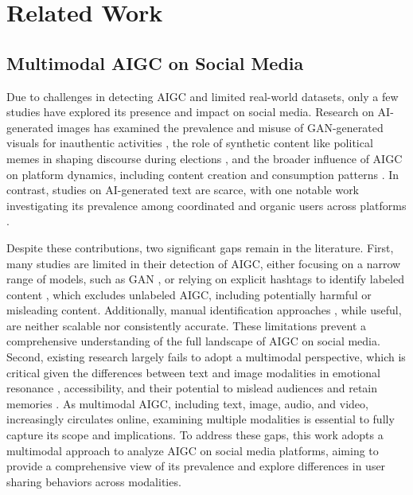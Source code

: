 \section{Related Work}
\subsection{Multimodal AIGC on Social Media}
Due to challenges in detecting AIGC and limited real-world datasets, only a few studies have explored its presence and impact on social media. Research on AI-generated images has examined the prevalence and misuse of GAN-generated visuals for inauthentic activities \cite{yang2024characteristics}, the role of synthetic content like political memes in shaping discourse during elections \cite{chang2024generative,minici2024uncovering}, and the broader influence of AIGC on platform dynamics, including content creation and consumption patterns \cite{wei2024understanding}. In contrast, studies on AI-generated text are scarce, with one notable work investigating its prevalence among coordinated and organic users across platforms \cite{cinus2024exposing}.

Despite these contributions, two significant gaps remain in the literature. First, many studies are limited in their detection of AIGC, either focusing on a narrow range of models, such as GAN \cite{yang2024characteristics,ricker2024ai}, or relying on explicit hashtags to identify labeled content \cite{wei2024understanding}, which excludes unlabeled AIGC, including potentially harmful or misleading content. Additionally, manual identification approaches \cite{chang2024generative}, while useful, are neither scalable nor consistently accurate. These limitations prevent a comprehensive understanding of the full landscape of AIGC on social media. Second, existing research largely fails to adopt a multimodal perspective, which is critical given the differences between text and image modalities in emotional resonance \cite{li2020picture}, accessibility, and their potential to mislead audiences \cite{barari2021political,sundar2021seeing} and retain memories \cite{kirkpatrick1894experimental}. As multimodal AIGC, including text, image, audio, and video, increasingly circulates online, examining multiple modalities is essential to fully capture its scope and implications. To address these gaps, this work adopts a multimodal approach to analyze AIGC on social media platforms, aiming to provide a comprehensive view of its prevalence and explore differences in user sharing behaviors across modalities.


